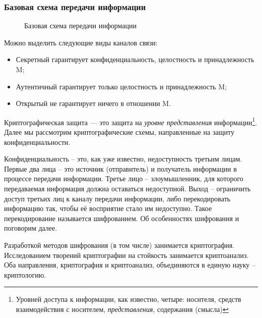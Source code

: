 \begin{frame}
\frametitle{Базовая схема передачи информации}
\begin{figure}
    \begin{center}
    \end{center}
    \caption{Базовая схема передачи информации}\label{pict:basechannel}
\end{figure} 

Можно выделить следующие виды \alert{каналов связи}:
\begin{itemize}
    \item \alert{Секретный} гарантирует конфиденциальность, целостность и принадлежность M;
    \item \alert{Аутентичный} гарантирует только целостность и принадлежность M;
    \item \alert{Открытый} не гарантирует ничего в отношении M.
\end{itemize}

\end{frame}


Криптографическая защита --- это защита на \emph{уровне представления} информации\footnote{Уровней доступа к информации, как известно, четыре: носителя, средств взаимодействия с носителем, \emph{представления}, содержания (смысла)}. Далее мы рассмотрим криптографические схемы, направленные на защиту конфиденциальности.

Конфиденциальность – это, как уже известно, недоступность третьим лицам. Первые два лица – это источник (отправитель) и получатель информации в процессе передачи информации. Третье лицо – злоумышленник, для которого передаваемая информация должна оставаться недоступной. Выход – ограничить доступ третьих лиц к каналу передачи информации, либо перекодировать информацию так, чтобы её восприятие стало им недоступно. Такое перекодирование называется шифрованием. Об особенностях шифрования и поговорим далее.

Разработкой методов шифрования (в том числе) занимается криптография. Исследованием творений криптографии на стойкость занимается криптоанализ. Оба направления, криптография и криптоанализ, объединяются в единую науку – криптологию.

